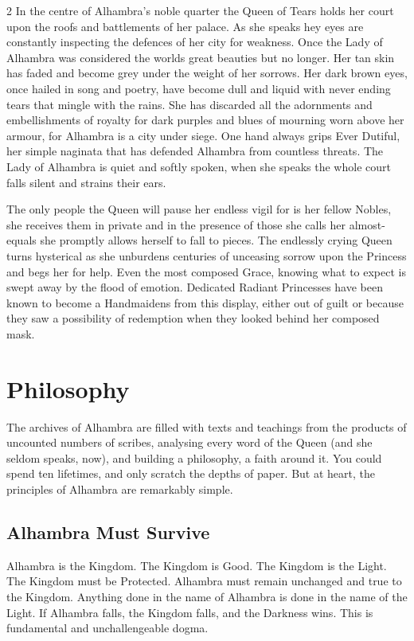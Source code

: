 \begin{multicols}{2}
In the centre of Alhambra's noble quarter the Queen of Tears holds her court upon the roofs and battlements of her palace. As she speaks hey eyes are constantly inspecting the defences of her city for weakness. Once the Lady of Alhambra was considered the worlds great beauties but no longer. Her tan skin has faded and become grey under the weight of her sorrows. Her dark brown eyes, once hailed in song and poetry, have become dull and liquid with never ending tears that mingle with the rains. She has discarded all the adornments and embellishments of royalty for dark purples and blues of mourning worn above her armour, for Alhambra is a city under siege. One hand always grips Ever Dutiful, her simple naginata that has defended Alhambra from countless threats. The Lady of Alhambra is quiet and softly spoken, when she speaks the whole court falls silent and strains their ears.

The only people the Queen will pause her endless vigil for is her fellow Nobles, she receives them in private and in the presence of those she calls her almost-equals she promptly allows herself to fall to pieces. The endlessly crying Queen turns hysterical as she unburdens centuries of unceasing sorrow upon the Princess and begs her for help. Even the most composed Grace, knowing what to expect is swept away by the flood of emotion. Dedicated Radiant Princesses have been known to become a Handmaidens from this display, either out of guilt or because they saw a possibility of redemption when they looked behind her composed mask. 

\section*{Philosophy}

The archives of Alhambra are filled with texts and teachings from the products of uncounted numbers of scribes, analysing every word of the Queen (and she seldom speaks, now), and building a philosophy, a faith around it. You could spend ten lifetimes, and only scratch the depths of paper. But at heart, the principles of Alhambra are remarkably simple. 

\subsection*{Alhambra Must Survive}

Alhambra is the Kingdom. The Kingdom is Good. The Kingdom is the Light. The Kingdom must be Protected. Alhambra must remain unchanged and true to the Kingdom. Anything done in the name of Alhambra is done in the name of the Light. If Alhambra falls, the Kingdom falls, and the Darkness wins. This is fundamental and unchallengeable dogma. 


\end{multicols}
